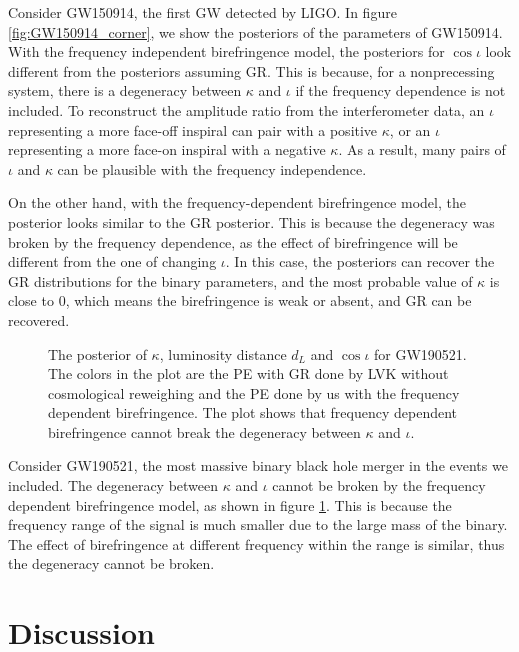 \documentclass[reprint,amsmath,amssymb,aps,twocolumn]{aastex631}
\begin{document}
Consider GW150914, the first GW detected by LIGO.
In figure \ref{fig:GW150914_corner}, we show the posteriors of the parameters of GW150914.
With the frequency independent birefringence model, the posteriors for $\cos\iota$ look different from the posteriors assuming GR.
This is because, for a nonprecessing system, there is a degeneracy between $\kappa$ and $\iota$ if the frequency dependence is not included.
To reconstruct the amplitude ratio from the interferometer data, an $\iota$ representing a more face-off inspiral can pair with a positive $\kappa$, or an $\iota$ representing a more face-on inspiral with a negative $\kappa$.
As a result, many pairs of $\iota$ and $\kappa$ can be plausible with the frequency independence.

On the other hand, with the frequency-dependent birefringence model, the posterior looks similar to the GR posterior.
This is because the degeneracy was broken by the frequency dependence, as the effect of birefringence will be different from the one of changing $\iota$.
In this case, the posteriors can recover the GR distributions for the binary parameters,
and the most probable value of $\kappa$ is close to $0$, which means the birefringence is weak or absent, and GR can be recovered.


\begin{figure}[h]
    \caption{
        The posterior of $\kappa$, luminosity distance $d_L$ and $\cos{\iota}$ for GW190521.
        The colors in the plot are the PE with GR done by LVK without cosmological reweighing \citep{GWTC-2.1, GWTC-3} and the PE done by us with the frequency dependent birefringence.
        The plot shows that frequency dependent birefringence cannot break the degeneracy between $\kappa$ and $\iota$.
    }
    \label{fig:corner_GW190521}
\end{figure}

Consider GW190521, the most massive binary black hole merger in the events we included.
The degeneracy between $\kappa$ and $\iota$ cannot be broken by the frequency dependent birefringence model, as shown in figure \ref{fig:corner_GW190521}.
This is because the frequency range of the signal is much smaller due to the large mass of the binary.
The effect of birefringence at different frequency within the range is similar, thus the degeneracy cannot be broken.

\section{Discussion}
\label{sec:Discussion}
\end{document}
